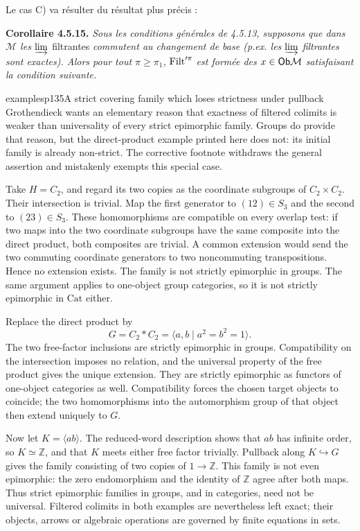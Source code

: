 Le cas C) va résulter du résultat plus précis :

\textbf{Corollaire 4.5.15.} \textit{Sous les conditions générales de 4.5.13, supposons que dans $\mathcal{M}$ les} $\varinjlim$
filtrantes \textit{commutent au changement de base (p.ex. les} $\varinjlim$ \textit{filtrantes sont exactes). Alors pour tout $\pi \geqslant \pi_1$,} $\mathrm{Filt}'^{\pi}$ \textit{est formée des $x \in \mathsf{Ob} \mathcal{M}$ satisfaisant la condition suivante.}

\begin{dcomment}{examples}{p135}{A strict covering family which loses strictness under pullback}
Grothendieck wants an elementary reason that exactness of filtered colimits is weaker than universality of every strict epimorphic family. Groups do provide that reason, but the direct-product example printed here does not: its initial family is already non-strict. The corrective footnote withdraws the general assertion and mistakenly exempts this special case.

Take $H=C_2$, and regard its two copies as the coordinate subgroups of $C_2\times C_2$. Their intersection is trivial. Map the first generator to $(12)\in S_3$ and the second to $(23)\in S_3$. These homomorphisms are compatible on every overlap test: if two maps into the two coordinate subgroups have the same composite into the direct product, both composites are trivial. A common extension would send the two commuting coordinate generators to two noncommuting transpositions. Hence no extension exists. The family is not strictly epimorphic in groups. The same argument applies to one-object group categories, so it is not strictly epimorphic in $\mathrm{Cat}$ either.

Replace the direct product by
\[
 G=C_2*C_2=\langle a,b\mid a^2=b^2=1\rangle.
\]
The two free-factor inclusions are strictly epimorphic in groups. Compatibility on the intersection imposes no relation, and the universal property of the free product gives the unique extension. They are strictly epimorphic as functors of one-object categories as well. Compatibility forces the chosen target objects to coincide; the two homomorphisms into the automorphism group of that object then extend uniquely to $G$.

Now let $K=\langle ab\rangle$. The reduced-word description shows that $ab$ has infinite order, so $K\simeq\mathbb Z$, and that $K$ meets either free factor trivially. Pullback along $K\hookrightarrow G$ gives the family consisting of two copies of $1\to\mathbb Z$. This family is not even epimorphic: the zero endomorphism and the identity of $\mathbb Z$ agree after both maps. Thus strict epimorphic families in groups, and in categories, need not be universal. Filtered colimits in both examples are nevertheless left exact; their objects, arrows or algebraic operations are governed by finite equations in sets.


\end{dcomment}
